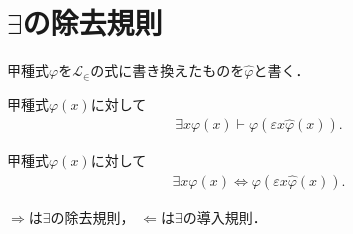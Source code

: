 \section{$\exists$の除去規則}
	甲種式$\varphi$を$\mathcal{L}_{\in}$の式に書き換えたものを$\hat{\varphi}$と書く．
	
	\begin{screen}
		\begin{logicalaxm}
			甲種式$\varphi(x)$に対して
			\begin{align}
				\exists x \varphi(x) \vdash 
				\varphi\left(\varepsilon x \hat{\varphi}(x)\right).
			\end{align}
		\end{logicalaxm}
	\end{screen}

	\begin{screen}
		\begin{thm}
			甲種式$\varphi(x)$に対して
			\begin{align}
				\exists x \varphi(x) \Longleftrightarrow
				\varphi\left(\varepsilon x \hat{\varphi}(x)\right).
			\end{align}
		\end{thm}
	\end{screen}
	
	\begin{sketch}
		$\Longrightarrow$は$\exists$の除去規則，
		$\Longleftarrow$は$\exists$の導入規則．
		\QED
	\end{sketch}